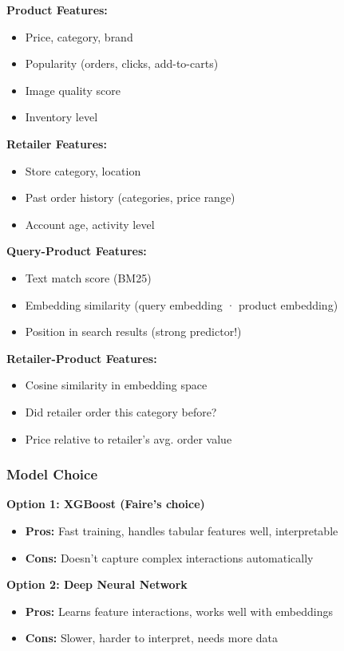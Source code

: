 \documentclass[11pt,letterpaper]{article}
\begin{document}
\textbf{Product Features:}
\begin{itemize}
    \item Price, category, brand
    \item Popularity (orders, clicks, add-to-carts)
    \item Image quality score
    \item Inventory level
\end{itemize}

\textbf{Retailer Features:}
\begin{itemize}
    \item Store category, location
    \item Past order history (categories, price range)
    \item Account age, activity level
\end{itemize}

\textbf{Query-Product Features:}
\begin{itemize}
    \item Text match score (BM25)
    \item Embedding similarity (query embedding · product embedding)
    \item Position in search results (strong predictor!)
\end{itemize}

\textbf{Retailer-Product Features:}
\begin{itemize}
    \item Cosine similarity in embedding space
    \item Did retailer order this category before?
    \item Price relative to retailer's avg. order value
\end{itemize}

\subsubsection{Model Choice}

\textbf{Option 1: XGBoost (Faire's choice)}
\begin{itemize}
    \item \textbf{Pros:} Fast training, handles tabular features well, interpretable
    \item \textbf{Cons:} Doesn't capture complex interactions automatically
\end{itemize}

\textbf{Option 2: Deep Neural Network}
\begin{itemize}
    \item \textbf{Pros:} Learns feature interactions, works well with embeddings
    \item \textbf{Cons:} Slower, harder to interpret, needs more data
\end{itemize}
\end{document}
